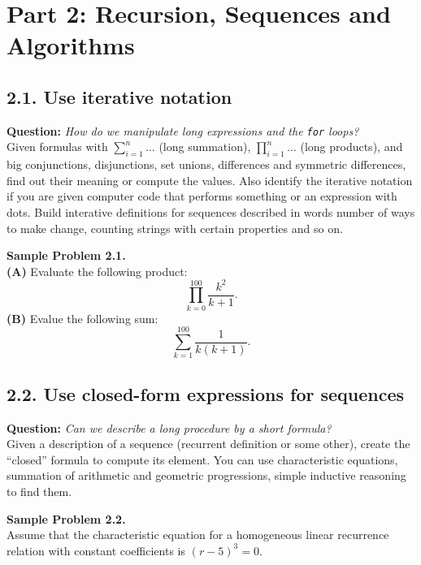 \documentclass[jou]{apa6}
\begin{document}
\newpage
\section{Part 2: Recursion, Sequences and Algorithms}

\subsection{2.1. Use iterative notation}

{\bf Question:} {\em How do we manipulate long expressions and the {\tt for} loops?}\\
{\scriptsize
Given formulas with $\sum_{i=1}^n\ldots$ (long summation), $\prod_{i=1}^n\ldots$ (long products), 
and big conjunctions, disjunctions, set unions, differences and symmetric differences, 
find out their meaning or compute the values. Also identify the iterative notation 
if you are given computer code that performs something or an expression with dots. 
Build interative definitions for sequences described in words \textendash{} 
number of ways to make change, counting strings with certain properties and so on.
}



\vspace{6pt}
{\bf Sample Problem 2.1.}\\
{\bf (A)} Evaluate the following product:
$$\prod\limits_{k=0}^{100} \frac{k^2}{k+1}.$$
{\bf (B)} Evalue the following sum: 
$$\sum\limits_{k=1}^{100} \frac{1}{k(k+1)}.$$


\subsection{2.2. Use closed-form expressions for sequences}

{\bf Question:} {\em Can we describe a long procedure by a short formula?}\\
{\scriptsize
Given a description of a sequence (recurrent definition or some other), 
create the ``closed'' formula to compute its element. You can use 
characteristic equations, summation of arithmetic and 
geometric progressions, simple inductive reasoning to find them.
}

\vspace{6pt}
{\bf Sample Problem 2.2.}\\
Assume that the characteristic equation for a 
homogeneous linear recurrence relation with constant coefficients
is $(r-5)^3 = 0$. 
\end{document}
